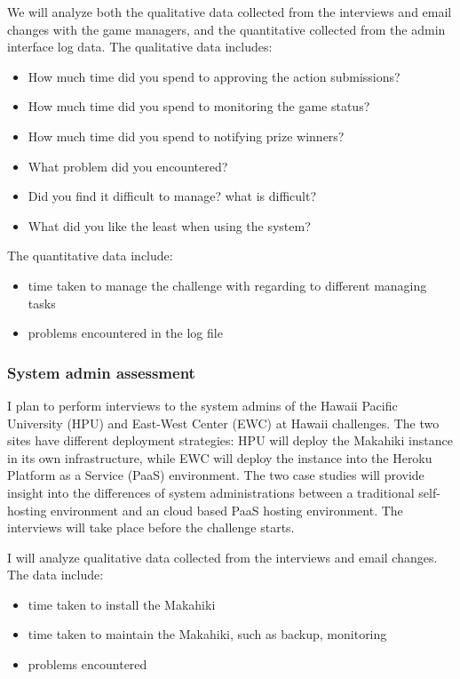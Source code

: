 We will analyze both the qualitative data collected from the interviews and email changes with the game managers, and the quantitative collected from the admin interface log data. The qualitative data includes:
\begin{itemize}
\item How much time did you spend to approving the action submissions?
\item How much time did you spend to monitoring the game status?
\item How much time did you spend to notifying prize winners?
\item What problem did you encountered?
\item Did you find it difficult to manage? what is difficult?
\item What did you like the least when using the system?
\end{itemize}

The quantitative data include:
\begin{itemize}
 \item time taken to manage the challenge with regarding to different managing tasks
 \item problems encountered in the log file
\end{itemize}

\subsubsection{System admin assessment}
I plan to perform interviews to the system admins of the Hawaii Pacific University (HPU) and East-West Center (EWC) at Hawaii challenges. The two sites have different deployment strategies: HPU will deploy the Makahiki instance in its own infrastructure, while EWC will deploy the instance into the Heroku Platform as a Service (PaaS) environment. The two case studies will provide insight into the differences of system administrations between a traditional self-hosting environment and an cloud based PaaS hosting environment. The interviews will take place before the challenge starts.

I will analyze qualitative data collected from the interviews and email changes. The data include:
\begin{itemize}
 \item time taken to install the Makahiki
 \item time taken to maintain the Makahiki, such as backup, monitoring
 \item problems encountered
\end{itemize}

